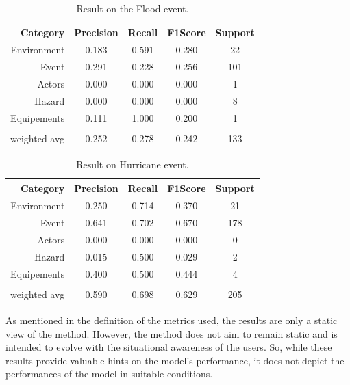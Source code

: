 \begin{table}[bp]
    \centering
    \caption{Result on the Flood event.}
    \begin{tabular}{rcccc}
        Category     & Precision & Recall & F1\-Score & Support \\
        \toprule
        Environment  & 0.183     & 0.591  & 0.280     & 22      \\
        Event        & 0.291     & 0.228  & 0.256     & 101     \\
        Actors       & 0.000     & 0.000  & 0.000     & 1       \\
        Hazard       & 0.000     & 0.000  & 0.000     & 8       \\
        Equipements  & 0.111     & 1.000  & 0.200     & 1       \\
                     &           &        &           &         \\
        weighted avg & 0.252     & 0.278  & 0.242     & 133     \\
        \bottomrule
    \end{tabular}
    \label{table:flood-results}
\end{table}

\begin{table}[bp]
    \centering
    \caption{Result on Hurricane event.}
    \begin{tabular}{rcccc}
        Category     & Precision & Recall & F1\-Score & Support \\
        \toprule
        Environment  & 0.250     & 0.714  & 0.370     & 21      \\
        Event        & 0.641     & 0.702  & 0.670     & 178     \\
        Actors       & 0.000     & 0.000  & 0.000     & 0       \\
        Hazard       & 0.015     & 0.500  & 0.029     & 2       \\
        Equipements  & 0.400     & 0.500  & 0.444     & 4       \\
                     &           &        &           &         \\
        weighted avg & 0.590     & 0.698  & 0.629     & 205     \\
        \bottomrule
    \end{tabular}
    \label{table:hurricane-results}
\end{table}

As mentioned in the definition of the metrics used, the results are only a static view of the method.
However, the method does not aim to remain static and is intended to evolve with the situational awareness of the users.
So, while these results provide valuable hints on the model's performance, it does not depict the performances of the model in suitable conditions.

